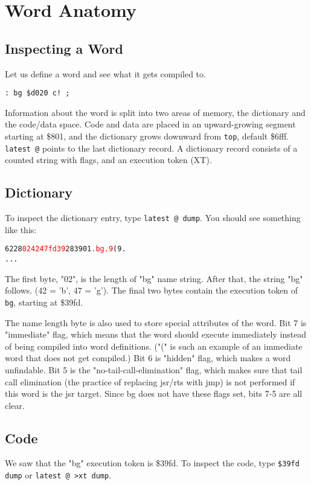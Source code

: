 \chapter{Word Anatomy}

\section{Inspecting a Word}

Let us define a word and see what it gets compiled to.

\begin{verbatim}
: bg $d020 c! ;
\end{verbatim}

Information about the word is split into two areas of memory, the dictionary and the code/data space. Code and data are placed in an upward-growing segment starting at \$801, and the dictionary grows downward from \texttt{top}, default \$6fff. \texttt{latest @} points to the last dictionary record. A dictionary record consists of a counted string with flags, and an execution token (XT).

\section{Dictionary}
To inspect the dictionary entry, type \texttt{latest @ dump}. You should see something like this:

\begin{alltt}
6228  \textcolor{red}{02 42 47 fd 39} 28 39 01 \textcolor{red}{.bg.9}(9.
...
\end{alltt}

The first byte, "02", is the length of "bg" name string. After that, the string "bg" follows. (42 = 'b', 47 = 'g'). The final two bytes contain the execution token of \texttt{bg}, starting at \$39fd.

The name length byte is also used to store special attributes of the word. Bit 7 is "immediate" flag, which means that the word should execute immediately instead of being compiled into word definitions. ("(" is such an example of an immediate word that does not get compiled.) Bit 6 is "hidden" flag, which makes a word unfindable. Bit 5 is the "no-tail-call-elimination" flag, which makes sure that tail call elimination (the practice of replacing jsr/rts with jmp) is not performed if this word is the jsr target. Since bg does not have these flags set, bits 7-5 are all clear.

\section{Code}
We saw that the "bg" execution token is \$39fd. To inspect the code, type \texttt{\$39fd dump} or \texttt{latest @ >xt dump}.

